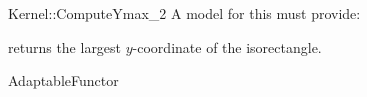 \begin{ccRefFunctionObjectConcept}{Kernel::ComputeYmax_2}
A model for this must provide:


       {returns the largest $y$-coordinate of the isorectangle.}


\ccRefines
AdaptableFunctor



\end{ccRefFunctionObjectConcept}
